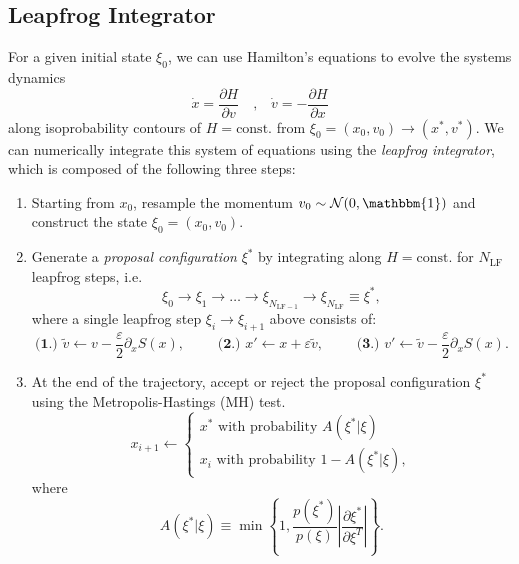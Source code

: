 \documentclass[a4paper,11pt]{article}
\begin{document}
\subsection{\label{subsec:lf}Leapfrog Integrator}
%
For a given initial state \(\xi_{0}\), we can use Hamilton's equations to
evolve the systems dynamics 
%
\begin{equation}
    \dot{x} = \frac{\partial H}{\partial v}\quad \text{,} \quad \dot{v} = -\frac{\partial H}{\partial x}
\end{equation}
%
along isoprobability contours of \(H =\text{const.}\) from \(\xi_{0} = (x_{0},
v_{0})\rightarrow (x^{\ast}, v^{\ast})\).
%
We can numerically integrate this system of equations using the \emph{leapfrog
integrator}, which is composed of the following three steps:
%
\begin{enumerate}
    \item Starting from \(x_{0}\), resample the momentum \(v_{0}\sim
        \mathcal{N}(0, \mathbbm{1})\) and construct the state \(\xi_{0} =
        (x_{0}, v_{0})\).
    \item Generate a \emph{proposal configuration} \(\xi^{\ast}\) by integrating
        along \(H = \mathrm{const.}\) for \(N_{\mathrm{LF}}\) leapfrog steps,
        i.e.
        \begin{equation}
            \xi_{0}\rightarrow \xi_{1}\rightarrow\ldots\rightarrow \xi_{N_{\mathrm{LF} - 1}}\rightarrow \xi_{N_{\mathrm{LF}}} \equiv \xi^{\ast},
        \end{equation}
        where a single leapfrog step \(\xi_{i} \rightarrow \xi_{i+1}\) above
        consists of: 
        \begin{equation}
            \textbf{(1.) } \tilde{v}\leftarrow v - \frac{\varepsilon}{2}\partial_{x} S(x),
            \quad\quad \textbf{ (2.) } x' \leftarrow x + \varepsilon \tilde{v},
            \quad\quad \textbf{ (3.) } v' \leftarrow \tilde{v} - \frac{\varepsilon}{2}\partial_{x} S(x).
        \end{equation}
    \item At the end of the trajectory, accept or reject the proposal
        configuration \(\xi^{\ast}\) using the Metropolis-Hastings (MH) test.
        \begin{equation}
            x_{i+1} \leftarrow
            \begin{cases}
                x^{\ast}\text{ with probability } A(\xi^{\ast}|\xi)\\
                x_{i}\text{ with probability } 1 - A(\xi^{\ast}|\xi),
            \end{cases}
        \end{equation}
        where
        \begin{equation}
            A(\xi^{\ast}|\xi) \equiv \min\left\{1, \frac{p(\xi^{\ast})}{p(\xi)}\left|\frac{\partial \xi^{\ast}}{\partial \xi^{T}}\right|\right\}.
        \end{equation}
\end{enumerate}
\end{document}
